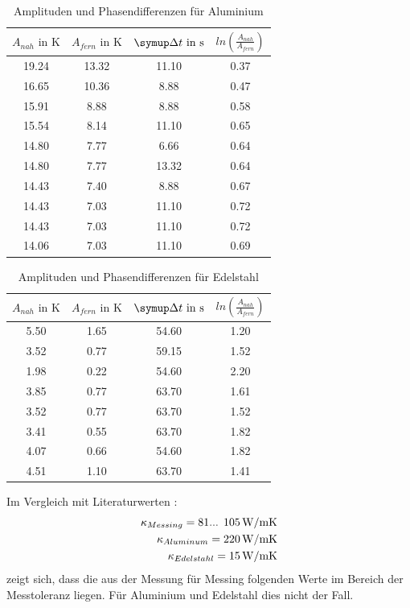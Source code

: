 \begin{table}[b]
  \centering
  \caption{Amplituden und Phasendifferenzen für Aluminium}
  \label{tab:Alu}
  \begin{tabular}{c c c c}
    \toprule
    $A_{nah} \text{ in } \si{\kelvin}$ & $A_{fern} \text{ in } \si{\kelvin}$ & $\symup \Delta t \text{ in } \si{\second}$ & $ ln(\frac{A_{nah}}{A_{fern}}) $ \\
    \midrule
    19.24 & 13.32 & 11.10 & 0.37 \\
    16.65 & 10.36 & 8.88 & 0.47 \\
    15.91 & 8.88 & 8.88 & 0.58 \\
    15.54 & 8.14 & 11.10 & 0.65 \\
    14.80 & 7.77 & 6.66 & 0.64 \\
    14.80 & 7.77 & 13.32 & 0.64 \\
    14.43 & 7.40 & 8.88 & 0.67 \\
    14.43 & 7.03 & 11.10 & 0.72 \\
    14.43 & 7.03 & 11.10 & 0.72 \\
    14.06 & 7.03 & 11.10 & 0.69 \\
    \bottomrule
  \end{tabular}
\end{table}

\begin{table}[b]
  \centering
  \caption{Amplituden und Phasendifferenzen für Edelstahl}
  \label{tab:Edelstahl}
  \begin{tabular}{c c c c}
    \toprule
    $A_{nah} \text{ in } \si{\kelvin}$ & $A_{fern} \text{ in } \si{\kelvin}$ & $\symup \Delta t \text{ in } \si{\second}$ & $ln(\frac{A_{nah}}{A_{fern}})$\\
    \midrule
    5.50 & 1.65 & 54.60 & 1.20 \\
    3.52 & 0.77 & 59.15 & 1.52 \\
    1.98 & 0.22 & 54.60 & 2.20 \\
    3.85 & 0.77 & 63.70 & 1.61 \\
    3.52 & 0.77 & 63.70 & 1.52 \\
    3.41 & 0.55 & 63.70 & 1.82 \\
    4.07 & 0.66 & 54.60 & 1.82 \\
    4.51 & 1.10 & 63.70 & 1.41 \\
    \bottomrule
  \end{tabular}
\end{table}

Im Vergleich mit Literaturwerten \cite{literaturwerte}:
\begin{equation*}
  \begin{split}
    \kappa_{Messing} = \num{81}\text{... }\num{105}\,\si{\watt\per{\metre\kelvin}} \\
    \kappa_{Aluminum} = \SI{220}{\watt\per{\metre\kelvin}} \\
    \kappa_{Edelstahl} = \SI{15}{\watt\per{\metre\kelvin}}
  \end{split}
\end{equation*}
zeigt sich, dass die aus der Messung für Messing folgenden Werte im Bereich der Messtoleranz liegen. Für Aluminium und Edelstahl dies nicht der Fall.

